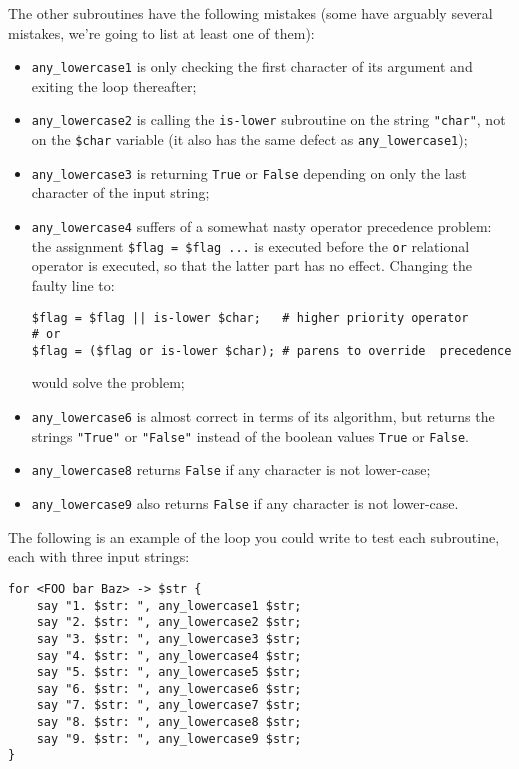 The other subroutines have the following mistakes (some have 
arguably several mistakes, we're going to list at least one of 
them):
\begin{itemize} 

\item \verb'any_lowercase1' is only checking the first 
character of its argument and exiting the loop thereafter;

\item \verb'any_lowercase2' is calling the {\tt is-lower} 
subroutine on the string {\tt "char"}, not on the 
{\tt \$char} variable (it also has the same defect as 
\verb'any_lowercase1');

\item \verb'any_lowercase3' is returning {\tt True} or 
{\tt False} depending on only the last character of the 
input string;

\item \verb'any_lowercase4' suffers of a somewhat nasty 
operator precedence problem: the assignment \verb'$flag = $flag ...' 
is executed before the {\tt or} relational operator is executed, 
so that the latter part has no effect. 
Changing the faulty line to:
\begin{verbatim}
$flag = $flag || is-lower $char;   # higher priority operator
# or
$flag = ($flag or is-lower $char); # parens to override  precedence
\end{verbatim}
would solve the problem;

\item \verb'any_lowercase6' is almost correct in terms of its 
algorithm, but returns the strings {\tt "True"} or 
{\tt "False"} instead of the boolean values {\tt True} or 
{\tt False}.

\item  \verb'any_lowercase8' returns {\tt False} if any 
character is not lower-case;

\item  \verb'any_lowercase9' also returns {\tt False} if any 
character is not lower-case.

\end{itemize}

The following is an example of the loop you could write to test 
each subroutine, each with three input strings:

\begin{verbatim}
for <FOO bar Baz> -> $str {
    say "1. $str: ", any_lowercase1 $str;
    say "2. $str: ", any_lowercase2 $str;
    say "3. $str: ", any_lowercase3 $str;
    say "4. $str: ", any_lowercase4 $str;
    say "5. $str: ", any_lowercase5 $str;
    say "6. $str: ", any_lowercase6 $str;
    say "7. $str: ", any_lowercase7 $str;
    say "8. $str: ", any_lowercase8 $str;
    say "9. $str: ", any_lowercase9 $str;
}
\end{verbatim}

